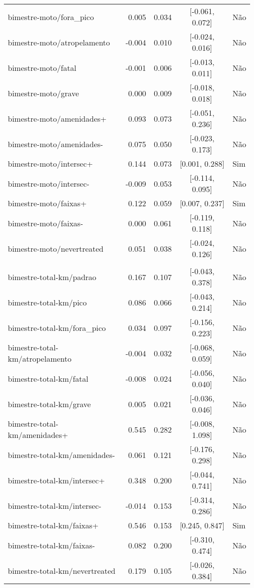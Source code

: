 \begin{longtable}{lrrcl}
bimestre-moto/fora\_pico & 0.005 & 0.034 & {}[-0.061, 0.072] & Não\\
bimestre-moto/atropelamento & -0.004 & 0.010 & {}[-0.024, 0.016] & Não\\
bimestre-moto/fatal & -0.001 & 0.006 & {}[-0.013, 0.011] & Não\\
bimestre-moto/grave & 0.000 & 0.009 & {}[-0.018, 0.018] & Não\\
bimestre-moto/amenidades+ & 0.093 & 0.073 & {}[-0.051, 0.236] & Não\\
bimestre-moto/amenidades- & 0.075 & 0.050 & {}[-0.023, 0.173] & Não\\
bimestre-moto/intersec+ & 0.144 & 0.073 & {}[0.001, 0.288] & Sim\\
bimestre-moto/intersec- & -0.009 & 0.053 & {}[-0.114, 0.095] & Não\\
bimestre-moto/faixas+ & 0.122 & 0.059 & {}[0.007, 0.237] & Sim\\
bimestre-moto/faixas- & 0.000 & 0.061 & {}[-0.119, 0.118] & Não\\
bimestre-moto/nevertreated & 0.051 & 0.038 & {}[-0.024, 0.126] & Não\\
 &  &  &  & \\
bimestre-total-km/padrao & 0.167 & 0.107 & {}[-0.043, 0.378] & Não\\
bimestre-total-km/pico & 0.086 & 0.066 & {}[-0.043, 0.214] & Não\\
bimestre-total-km/fora\_pico & 0.034 & 0.097 & {}[-0.156, 0.223] & Não\\
bimestre-total-km/atropelamento & -0.004 & 0.032 & {}[-0.068, 0.059] & Não\\
bimestre-total-km/fatal & -0.008 & 0.024 & {}[-0.056, 0.040] & Não\\
bimestre-total-km/grave & 0.005 & 0.021 & {}[-0.036, 0.046] & Não\\
bimestre-total-km/amenidades+ & 0.545 & 0.282 & {}[-0.008, 1.098] & Não\\
bimestre-total-km/amenidades- & 0.061 & 0.121 & {}[-0.176, 0.298] & Não\\
bimestre-total-km/intersec+ & 0.348 & 0.200 & {}[-0.044, 0.741] & Não\\
bimestre-total-km/intersec- & -0.014 & 0.153 & {}[-0.314, 0.286] & Não\\
bimestre-total-km/faixas+ & 0.546 & 0.153 & {}[0.245, 0.847] & Sim\\
bimestre-total-km/faixas- & 0.082 & 0.200 & {}[-0.310, 0.474] & Não\\
bimestre-total-km/nevertreated & 0.179 & 0.105 & {}[-0.026, 0.384] & Não\\

\end{longtable}
